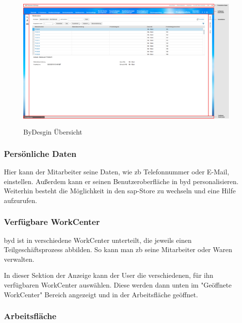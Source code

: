 \begin{figure}[H]
	\begin{center}
	\includegraphics[width=1.0\textwidth]{grafiken/ByDesign-Ubersicht.png}
	\caption{ByDesgin Übersicht}
	\vspace{-10pt}
	\label{abb:byd-overview}
	\end{center}
\end{figure}

\subsubsection{Persönliche Daten}

Hier kann der Mitarbeiter seine Daten, wie \gls{zb} Telefonnummer oder E-Mail, einstellen. Außerdem kann er seinen Benutzeroberfläche in \gls{byd} personalisieren. Weiterhin besteht die Möglichkeit in den \gls{sap}-Store zu wechseln und eine Hilfe aufzurufen.

\subsubsection{Verfügbare WorkCenter}

\gls{byd} ist in verschiedene WorkCenter unterteilt, die jeweils einen Teilgeschäftsprozess abbilden. So kann man \gls{zb} seine Mitarbeiter oder Waren verwalten.

In dieser Sektion der Anzeige kann der User die verschiedenen, für ihn verfügbaren WorkCenter auswählen. Diese werden dann unten im "Geöffnete WorkCenter" Bereich angezeigt und in der Arbeitsfläche geöffnet.

\subsubsection{Arbeitsfläche}

